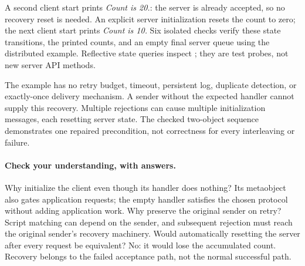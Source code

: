 A second client start prints \emph{Count is 20.}: the server is already
accepted, so no recovery reset is needed. An explicit server initialization
resets the count to zero; the next client start prints \emph{Count is 10.}
Six isolated checks verify these state transitions, the printed counts,
and an empty final server queue using the distributed example.
Reflective state queries inspect ; they are test probes, not
new server API methods.

The example has no retry budget, timeout, persistent log, duplicate detection,
or exactly-once delivery mechanism. A sender without the expected
 handler cannot supply this recovery. Multiple rejections can
cause multiple initialization messages, each resetting server state.
The checked two-object sequence demonstrates one repaired precondition,
not correctness for every interleaving or failure.

\paragraph{Check your understanding, with answers.}
Why initialize the client even though its handler does nothing?
Its metaobject also gates application requests; the empty handler satisfies
the chosen protocol without adding application work.
Why preserve the original sender on retry?
Script matching can depend on the sender, and subsequent rejection must
reach the original sender's recovery machinery.
Would automatically resetting the server after every request be equivalent?
No: it would lose the accumulated count. Recovery belongs to the failed
acceptance path, not the normal successful path.

